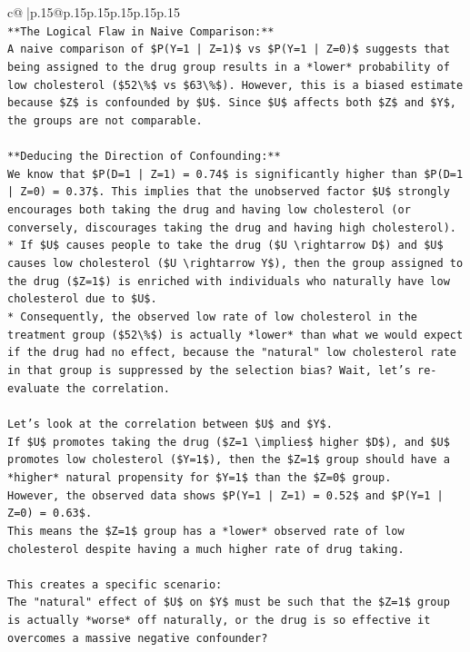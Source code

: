 \documentclass{article}
\begin{document}
{\begin{supertabular}{c@{$\;$}|p{.15\linewidth}@{}p{.15\linewidth}p{.15\linewidth}p{.15\linewidth}p{.15\linewidth}p{.15\linewidth}}
{{{\\ 
\texttt{**The Logical Flaw in Naive Comparison:**} \\
\texttt{A naive comparison of \$P(Y=1 | Z=1)\$ vs \$P(Y=1 | Z=0)\$ suggests that being assigned to the drug group results in a *lower* probability of low cholesterol (\$52\textbackslash{}\%\$ vs \$63\textbackslash{}\%\$). However, this is a biased estimate because \$Z\$ is confounded by \$U\$. Since \$U\$ affects both \$Z\$ and \$Y\$, the groups are not comparable.} \\
\\ 
\texttt{**Deducing the Direction of Confounding:**} \\
\texttt{We know that \$P(D=1 | Z=1) = 0.74\$ is significantly higher than \$P(D=1 | Z=0) = 0.37\$. This implies that the unobserved factor \$U\$ strongly encourages both taking the drug and having low cholesterol (or conversely, discourages taking the drug and having high cholesterol).} \\
\texttt{*   If \$U\$ causes people to take the drug (\$U \textbackslash{}rightarrow D\$) and \$U\$ causes low cholesterol (\$U \textbackslash{}rightarrow Y\$), then the group assigned to the drug (\$Z=1\$) is enriched with individuals who naturally have low cholesterol due to \$U\$.} \\
\texttt{*   Consequently, the observed low rate of low cholesterol in the treatment group (\$52\textbackslash{}\%\$) is actually *lower* than what we would expect if the drug had no effect, because the "natural" low cholesterol rate in that group is suppressed by the selection bias? Wait, let's re{-}evaluate the correlation.} \\
\\ 
\texttt{Let's look at the correlation between \$U\$ and \$Y\$.} \\
\texttt{If \$U\$ promotes taking the drug (\$Z=1 \textbackslash{}implies\$ higher \$D\$), and \$U\$ promotes low cholesterol (\$Y=1\$), then the \$Z=1\$ group should have a *higher* natural propensity for \$Y=1\$ than the \$Z=0\$ group.} \\
\texttt{However, the observed data shows \$P(Y=1 | Z=1) = 0.52\$ and \$P(Y=1 | Z=0) = 0.63\$.} \\
\texttt{This means the \$Z=1\$ group has a *lower* observed rate of low cholesterol despite having a much higher rate of drug taking.} \\
\\ 
\texttt{This creates a specific scenario:} \\
\texttt{The "natural" effect of \$U\$ on \$Y\$ must be such that the \$Z=1\$ group is actually *worse* off naturally, or the drug is so effective it overcomes a massive negative confounder?} \\
}}}
\end{supertabular}}
\end{document}
